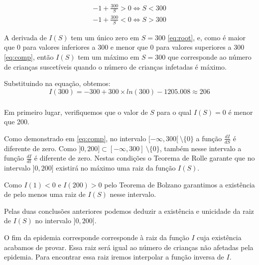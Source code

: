 \documentclass[portuguese, a4paper]{article}
\newcommand\eq[0]{\Leftrightarrow}
\begin{document}
		\begin{equation}
		\begin{split}
			\label{eq:comp}
			 -1 + \frac{300}{S} > 0 \eq S < 300 \\
			 -1 + \frac{300}{S} < 0 \eq S > 300
		\end{split}
		\end{equation}

		\par
		A derivada de $I(S)$ tem um único zero em $S = 300$ \eqref{eq:root},
		e, como é maior que 0 para valores inferiores a 300 e menor que 0
		para valores superiores a 300 \eqref{eq:comp}, então $I(S)$ tem um máximo
		em $S = 300$ que corresponde ao número de crianças suscetíveis
		quando o número de crianças infetadas é máximo.

		\par
		Substituindo na equação, obtemos:
		\begin{equation}
			I(300) = -300 + 300 \times ln(300) - 1205.008 \approx 206
		\end{equation}

		\subsubsection{} \label{sec:III.2b)}
		\par
		Em primeiro lugar, verifiquemos que o valor de $S$ para o qual $I(S) = 0$ é menor que 200.

		\par
		Como demonstrado em \eqref{eq:comp}, no intervalo
		$[-\infty,300[~\setminus\{0\}$ a função $\frac{dI}{dS}$ é diferente de
		zero. Como $]0,200] \subset [-\infty,300]~\setminus\{0\}$, também nesse
		intervalo a função $\frac{dI}{dt}$ é diferente de zero. Nestas condições
		o Teorema de Rolle garante que no intervalo $]0,200]$ existirá no máximo
		uma raiz da função $I(S)$.

		\par
		Como $I(1) < 0$ e $I(200) > 0$ pelo Teorema de Bolzano garantimos a
		existência de pelo menos uma raiz de $I(S)$ nesse intervalo.

		\par
		Pelas duas conclusões anteriores podemos deduzir a existência e
		unicidade da raiz de $I(S)$ no intervalo $]0, 200]$.

		\par \null \par
		O fim da epidemia corresponde corresponde à raiz da função $I$ cuja
		existência acabamos de provar. Essa raiz será igual ao número de
		crianças não afetadas pela epidemia. Para encontrar essa raiz iremos
		interpolar a função inversa de $I$.
\end{document}
